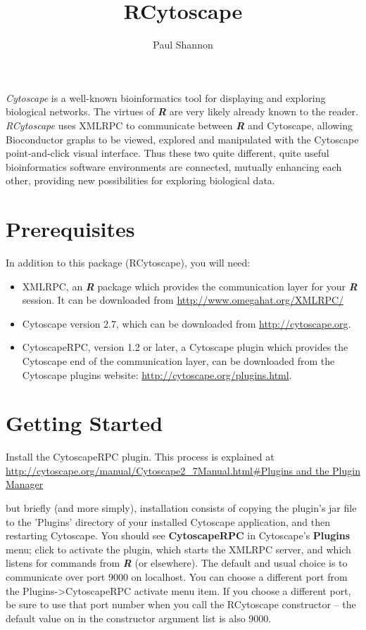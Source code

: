 \documentclass[12pt]{article}
\title{RCytoscape}
\author{Paul Shannon}
\begin{document}
\maketitle

\emph{Cytoscape} is a well-known bioinformatics tool for displaying and exploring biological networks.  The virtues of
\emph{\textbf{R}} are very likely already known to the reader.  \emph{RCytoscape} uses XMLRPC to communicate
between \emph{\textbf{R}} and Cytoscape, allowing Bioconductor graphs to be viewed, explored and manipulated with the
Cytoscape point-and-click visual interface.  Thus these two quite different, quite useful bioinformatics software
environments are connected, mutually enhancing each other, providing new possibilities for exploring biological data.

\section{Prerequisites}
In addition to this package (RCytoscape), you will need:

\begin{itemize}
  \item XMLRPC, an \emph{\textbf{R}} package which provides the communication layer for your \emph{\textbf{R}} session.  It can be downloaded from 
      \url{http://www.omegahat.org/XMLRPC/}
  \item Cytoscape version 2.7, which can be downloaded from 
     \url{http://cytoscape.org}.
  \item CytoscapeRPC, version 1.2 or later, a Cytoscape plugin which provides the Cytoscape end of the communication layer, can be downloaded from the Cytoscape plugins website:
     \url{http://cytoscape.org/plugins.html}.
\end{itemize}

\section{Getting Started}

Install the CytoscapeRPC plugin.  This process is explained at\\

 \url{http://cytoscape.org/manual/Cytoscape2_7Manual.html#Plugins and the Plugin Manager}\newline\newline

but briefly (and more simply), installation consists of copying the plugin's jar file to the 'Plugins' directory of your installed Cytoscape application, and then restarting Cytoscape.  You should see \textbf{CytoscapeRPC} in Cytoscape's \textbf{Plugins} menu; click to activate the plugin, which starts the XMLRPC server, and which listens for commands from \emph{\textbf{R}} (or elsewhere).  The default and usual choice is to communicate over port 9000 on localhost.  You can choose a different port from the Plugins->CytoscapeRPC activate menu item.  If you choose a different port, be sure to use that port number when you call the RCytoscape constructor -- the default value on in the constructor argument list is also 9000.
\end{document}
